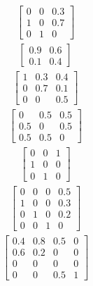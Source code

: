 \begin{tasks}[style=enumerate]
\task
  \begin{align*}
    \begin{bmatrix}
      0 & 0 & 0.3 \\
      1 & 0 & 0.7 \\
      0 & 1 & 0
    \end{bmatrix}
  \end{align*}
\task
  \begin{align*}
    \begin{bmatrix}
      0.9 & 0.6 \\
      0.1 & 0.4
    \end{bmatrix}
  \end{align*}
\task
  \begin{align*}
    \begin{bmatrix}
      1 & 0.3 & 0.4 \\
      0 & 0.7 & 0.1 \\
      0 & 0 & 0.5
    \end{bmatrix}
  \end{align*}
\task
  \begin{align*}
    \begin{bmatrix}
      0 & 0.5 & 0.5 \\
      0.5 & 0 & 0.5 \\
      0.5 & 0.5 & 0
    \end{bmatrix}
  \end{align*}
\task
  \begin{align*}
    \begin{bmatrix}
      0 & 0 & 1 \\
      1 & 0 & 0 \\
      0 & 1 & 0
    \end{bmatrix}
  \end{align*}
\task
  \begin{align*}
    \begin{bmatrix}
      0 & 0 & 0 & 0.5 \\
      1 & 0 & 0 & 0.3 \\
      0 & 1 & 0 & 0.2 \\
      0 & 0 & 1 & 0
    \end{bmatrix}
  \end{align*}
\task
  \begin{align*}
    \begin{bmatrix}
      0.4 & 0.8 & 0.5 & 0 \\
      0.6 & 0.2 & 0 & 0 \\
      0 & 0 & 0 & 0 \\
      0 & 0 & 0.5 & 1
    \end{bmatrix}
  \end{align*}
\end{tasks}


